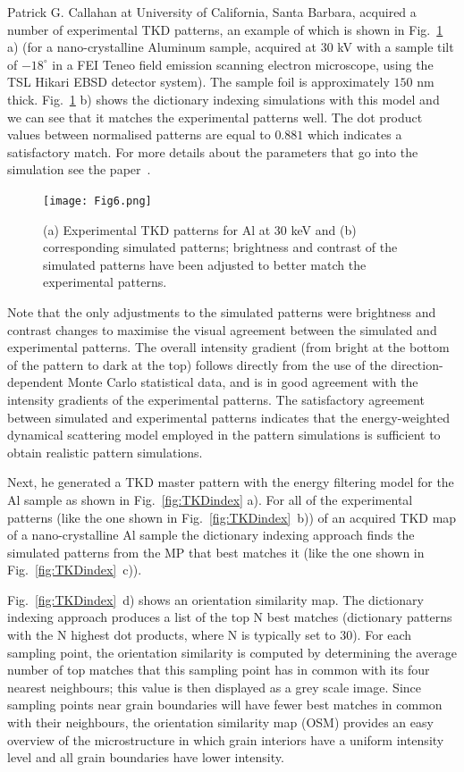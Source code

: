 Patrick G. Callahan at University of California, Santa Barbara, acquired a number of experimental TKD patterns, an example of which is shown in Fig.~\ref{fig:TKDpatternfit} a) (for a nano-crystalline Aluminum sample, acquired at $30$ kV with a sample tilt of $-18^{\circ}$ in a FEI Teneo field emission scanning electron microscope, using the TSL Hikari EBSD detector system). The sample foil is approximately $150$ nm thick.  Fig.~\ref{fig:TKDpatternfit} b) shows the dictionary indexing simulations with this model and we can see that it matches the experimental patterns well. The dot product values between normalised patterns are equal to $0.881$ which indicates a satisfactory match. For more details about the parameters that go into the simulation see the paper~\cite{PascalTKD}.


\begin{figure}[ht]
\centering
\texttt{[image: Fig6.png]}
\caption[Experimental TKD patterns for Al at $30$ keV and corresponding simulated patterns]{(a) Experimental TKD patterns for Al at $30$ keV and (b) corresponding simulated patterns; brightness and contrast of the simulated patterns have been adjusted to better match the experimental patterns. }
\label{fig:TKDpatternfit}
\end{figure}

Note that the only adjustments to the simulated patterns were brightness and contrast changes to maximise the visual agreement between the simulated and experimental patterns.  The overall intensity gradient (from bright at the bottom of the pattern to dark at the top) follows directly from the use of the direction-dependent Monte Carlo statistical data, and is in good agreement with the intensity gradients of the experimental patterns.  The satisfactory agreement between simulated and experimental patterns indicates that the energy-weighted dynamical scattering model employed in the pattern simulations is sufficient to obtain realistic pattern simulations. 

Next, he generated a TKD master pattern with the energy filtering model for the Al sample as shown in Fig.~\ref{fig:TKDindex} a). For all of the experimental patterns (like the one shown in  Fig.~\ref{fig:TKDindex}~b)) of an acquired TKD map of a nano-crystalline Al sample  the dictionary indexing approach finds the simulated patterns from the MP that best matches it (like the one shown in Fig.~\ref{fig:TKDindex}~c)). 

Fig.~\ref{fig:TKDindex}~d) shows an orientation similarity map. The dictionary indexing approach produces a list of the top N best matches (dictionary patterns with the N highest dot products, where N is typically set to 30). For each sampling point, the orientation similarity is computed by determining the average number of top matches that this sampling point has in common with its four nearest neighbours; this value is then displayed as a grey scale image. Since sampling points near grain boundaries will have fewer best matches in common with their neighbours, the orientation similarity map (OSM) provides an easy overview of the microstructure in which grain interiors have a uniform intensity level and all grain boundaries have lower intensity.

